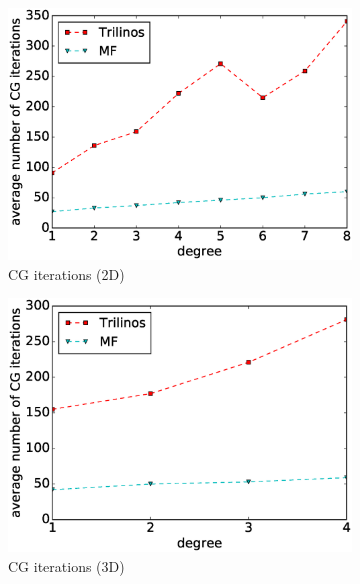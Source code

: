 \documentclass[preprint,12pt,times]{elsarticle}
\begin{document}
\begin{figure}[!ht]
  \begin{subfigure}[b]{0.49\textwidth}
    \centering
    \includegraphics[width=\textwidth]{IWR_cg2d.eps}
    \caption{CG iterations (2D)}
    \label{fig:benchmark_miehe_IWR_cg2}
  \end{subfigure}
  \begin{subfigure}[b]{0.49\textwidth}
    \centering
    \includegraphics[width=\textwidth]{IWR_cg3d.eps}
    \caption{CG iterations (3D)}
    \label{fig:benchmark_miehe_IWR_cg3}
  \end{subfigure}
  ~
  \begin{subfigure}[b]{0.49\textwidth}
    \centering

\end{subfigure}
\end{figure}
\end{document}
